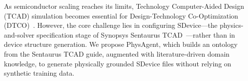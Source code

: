 As semiconductor scaling reaches its limits, Technology Computer-Aided Design (TCAD) simulation becomes essential for Design-Technology Co-Optimization (DTCO)~{\color{red}\cite{dtco}}. However, the core challenge lies in configuring SDevice---the physics-and-solver specification stage of {\color{red}Synopsys} Sentaurus TCAD~{\color{red}\cite{synopsys_tcad}}---rather than in device structure generation. We propose PhysAgent, which {\color{red}builds an ontology from the Sentaurus TCAD guide, augmented with literature-driven domain knowledge}, to generate physically grounded SDevice files without relying on synthetic training data.
